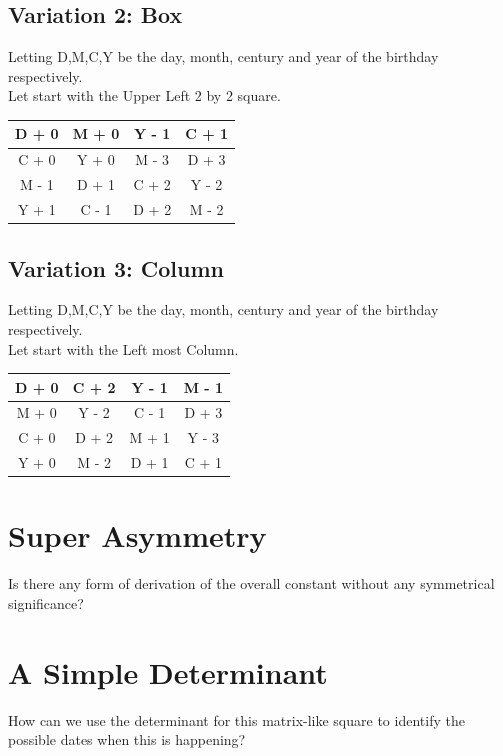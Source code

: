 \documentclass[a4paper,12pt,oneside]{book}
\begin{document}
    \subsection{Variation 2: Box}
        Letting D,M,C,Y be the day, month, century and year of the birthday respectively. \\
        Let start with the Upper Left 2 by 2 square. \\
        \def\arraystretch{2}
        \begin{center}
            \begin{tabular}{|c|c|c|c|}
                \hline
                D + 0 & M + 0 & Y - 1 & C + 1 \\
                \hline
                C + 0 & Y + 0 & M - 3 & D + 3 \\
                \hline
                M - 1 & D + 1 & C + 2 & Y - 2 \\
                \hline
                Y + 1 & C - 1 & D + 2 & M - 2 \\
                \hline
            \end{tabular}
        \end{center}
        
        
    \subsection{Variation 3: Column}
        Letting D,M,C,Y be the day, month, century and year of the birthday respectively. \\
        Let start with the Left most Column. \\
        
        \def\arraystretch{2}
        \begin{center}
            \begin{tabular}{|c|c|c|c|}
                \hline
                D + 0 & C + 2 & Y - 1 & M - 1 \\
                \hline
                M + 0 & Y - 2 & C - 1 & D + 3 \\
                \hline
                C + 0 & D + 2 & M + 1 & Y - 3 \\
                \hline
                Y + 0 & M - 2 & D + 1 & C + 1 \\
                \hline
            \end{tabular}
        \end{center}

\section{Super Asymmetry}
Is there any form of derivation of the overall constant without any symmetrical significance?


\section{A Simple Determinant}
How can we use the determinant for this matrix-like square to identify the possible dates when this is happening?




\end{document}
